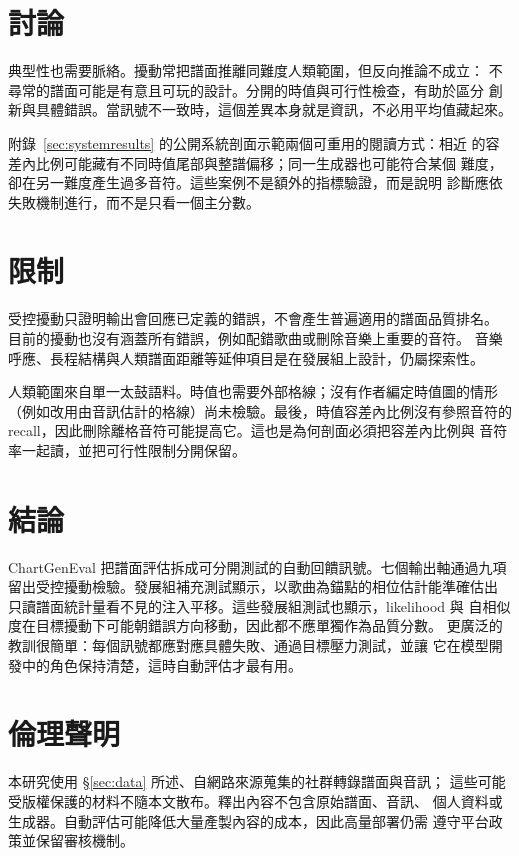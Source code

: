 \documentclass[10pt,twocolumn]{article}
\newcommand{\secref}[1]{\S\ref{#1}}
\begin{document}
\FloatBarrier

\section{討論}\label{sec:discussion}

典型性也需要脈絡。擾動常把譜面推離同難度人類範圍，但反向推論不成立：
不尋常的譜面可能是有意且可玩的設計。分開的時值與可行性檢查，有助於區分
創新與具體錯誤。當訊號不一致時，這個差異本身就是資訊，不必用平均值藏起來。

附錄~\ref{sec:systemresults} 的公開系統剖面示範兩個可重用的閱讀方式：相近
的容差內比例可能藏有不同時值尾部與整譜偏移；同一生成器也可能符合某個
難度，卻在另一難度產生過多音符。這些案例不是額外的指標驗證，而是說明
診斷應依失敗機制進行，而不是只看一個主分數。

\section{限制}\label{sec:limitations}

受控擾動只證明輸出會回應已定義的錯誤，不會產生普遍適用的譜面品質排名。
目前的擾動也沒有涵蓋所有錯誤，例如配錯歌曲或刪除音樂上重要的音符。
音樂呼應、長程結構與人類譜面距離等延伸項目是在發展組上設計，仍屬探索性。

人類範圍來自單一太鼓語料。時值也需要外部格線；沒有作者編定時值圖的情形
（例如改用由音訊估計的格線）尚未檢驗。最後，時值容差內比例沒有參照音符的
recall，因此刪除離格音符可能提高它。這也是為何剖面必須把容差內比例與
音符率一起讀，並把可行性限制分開保留。

\FloatBarrier

\section{結論}\label{sec:conclusion}

ChartGenEval 把譜面評估拆成可分開測試的自動回饋訊號。七個輸出軸通過九項
留出受控擾動檢驗。發展組補充測試顯示，以歌曲為錨點的相位估計能準確估出
只讀譜面統計量看不見的注入平移。這些發展組測試也顯示，likelihood 與
自相似度在目標擾動下可能朝錯誤方向移動，因此都不應單獨作為品質分數。
更廣泛的教訓很簡單：每個訊號都應對應具體失敗、通過目標壓力測試，並讓
它在模型開發中的角色保持清楚，這時自動評估才最有用。

\section*{倫理聲明}
本研究使用 \secref{sec:data} 所述、自網路來源蒐集的社群轉錄譜面與音訊；
這些可能受版權保護的材料不隨本文散布。釋出內容不包含原始譜面、音訊、
個人資料或生成器。自動評估可能降低大量產製內容的成本，因此高量部署仍需
遵守平台政策並保留審核機制。
\end{document}
